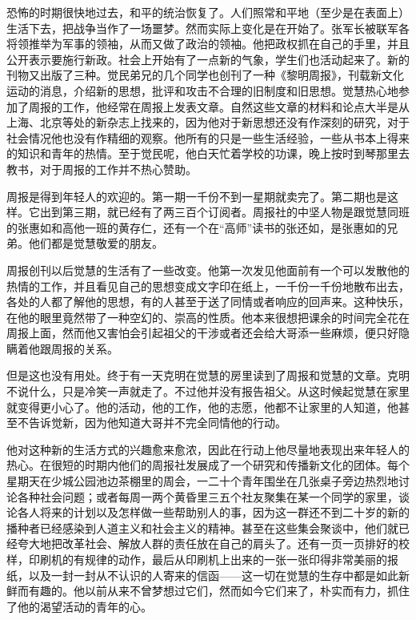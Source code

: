 \par 恐怖的时期很快地过去，和平的统治恢复了。人们照常和平地（至少是在表面上）生活下去，把战争当作了一场噩梦。然而实际上变化是在开始了。张军长被联军各将领推举为军事的领袖，从而又做了政治的领袖。他把政权抓在自己的手里，并且公开表示要施行新政。社会上开始有了一点新的气象，学生们也活动起来了。新的刊物又出版了三种。觉民弟兄的几个同学也创刊了一种《黎明周报》，刊载新文化运动的消息，介绍新的思想，批评和攻击不合理的旧制度和旧思想。觉慧热心地参加了周报的工作，他经常在周报上发表文章。自然这些文章的材料和论点大半是从上海、北京等处的新杂志上找来的，因为他对于新思想还没有作深刻的研究，对于社会情况他也没有作精细的观察。他所有的只是一些生活经验，一些从书本上得来的知识和青年的热情。至于觉民呢，他白天忙着学校的功课，晚上按时到琴那里去教书，对于周报的工作并不热心赞助。
\par 周报是得到年轻人的欢迎的。第一期一千份不到一星期就卖完了。第二期也是这样。它出到第三期，就已经有了两三百个订阅者。周报社的中坚人物是跟觉慧同班的张惠如和高他一班的黄存仁，还有一个在“高师”读书的张还如，是张惠如的兄弟。他们都是觉慧敬爱的朋友。
\par 周报创刊以后觉慧的生活有了一些改变。他第一次发见他面前有一个可以发散他的热情的工作，并且看见自己的思想变成文字印在纸上，一千份一千份地散布出去，各处的人都了解他的思想，有的人甚至于送了同情或者响应的回声来。这种快乐，在他的眼里竟然带了一种空幻的、崇高的性质。他本来很想把课余的时间完全花在周报上面，然而他又害怕会引起祖父的干涉或者还会给大哥添一些麻烦，便只好隐瞒着他跟周报的关系。
\par 但是这也没有用处。终于有一天克明在觉慧的房里读到了周报和觉慧的文章。克明不说什么，只是冷笑一声就走了。不过他并没有报告祖父。从这时候起觉慧在家里就变得更小心了。他的活动，他的工作，他的志愿，他都不让家里的人知道，他甚至不告诉觉新，因为他知道大哥并不完全同情他的行动。
\par 他对这种新的生活方式的兴趣愈来愈浓，因此在行动上他尽量地表现出来年轻人的热心。在很短的时期内他们的周报社发展成了一个研究和传播新文化的团体。每个星期天在少城公园池边茶棚里的周会，一二十个青年围坐在几张桌子旁边热烈地讨论各种社会问题；或者每周一两个黄昏里三五个社友聚集在某一个同学的家里，谈论各人将来的计划以及怎样做一些帮助别人的事，因为这一群还不到二十岁的新的播种者已经感染到人道主义和社会主义的精神。甚至在这些集会聚谈中，他们就已经夸大地把改革社会、解放人群的责任放在自己的肩头了。还有一页一页排好的校样，印刷机的有规律的动作，最后从印刷机上出来的一张一张印得非常美丽的报纸，以及一封一封从不认识的人寄来的信函——这一切在觉慧的生存中都是如此新鲜而有趣的。他以前从来不曾梦想过它们，然而如今它们来了，朴实而有力，抓住了他的渴望活动的青年的心。

